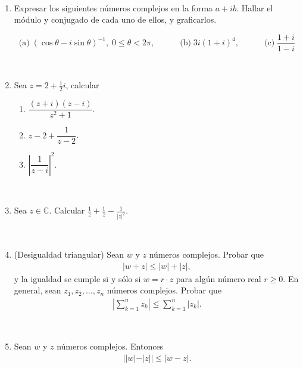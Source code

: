 \documentclass[a4paper,12pt,twoside,spanish,reqno]{amsbook}
\numberwithin{equation}{section}
\begin{document}
\

\begin{enumerate}[resume]

\item Expresar los siguientes n{ú}meros complejos en la forma $a +i b$. Hallar el módulo y conjugado de cada uno de ellos, y graficarlos.

$$\textrm{(a)}\; (\cos\theta - i\sin\theta)^{-1},\; 0\leq\theta<2\pi, \quad \qquad
\textrm{(b)} \; 3 i(1 + i)^4, \quad \qquad
\textrm{(c)} \; \dfrac{1+i}{1-i}$$


\

  \item Sea $z=2+\frac{1}{2}i$, calcular
 \begin{multicols}{3}
\begin{enumerate}
\item $\dfrac{(z+i)(z-i)}{z^2+1}$.
\item $z-2 + \dfrac{1}{z-2}$.
\item $\left|\dfrac{1}{z-i}\right|^2$.
\end{enumerate}
\end{multicols}

\

\item Sea $z\in\mathbb{C}$. Calcular $\frac{1}{z}+\frac{1}{\overline{z}} - \frac{1}{|z|^2}$.

%

\

\item\label{desT} (Desigualdad triangular) Sean $w$ y $z$ números complejos. Probar que
\begin{eqnarray*}
  |w + z| \leq |w| + |z|,
\end{eqnarray*}
y la igualdad se cumple si y sólo si $w= r\cdot z$ para algún número real $r \geq 0$.
En general, sean $z_1,z_2,\ldots, z_n$ números complejos. Probar que
\begin{eqnarray*}
  \left|\sum_{k=1}^{n} z_k\right| \leq \sum_{k=1}^{n} |z_k|.
\end{eqnarray*}

\

\item Sean $w$ y $z$ números complejos. Entonces
\begin{eqnarray*}
  ||w|-|z|| \leq |w-z|.
\end{eqnarray*}

\end{enumerate}
\end{document}
